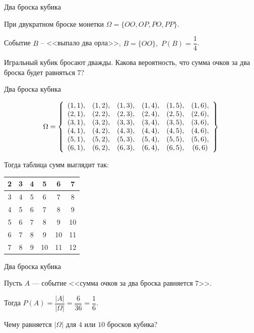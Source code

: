 \begin{frame}{Два броска кубика}

\exmpl При двукратном броске монетки $\Omega=\{OO,OP,PO,PP\}.$ 

Событие $B$ -- <<выпало два орла>>, $B=\{OO\},$ $P(B)=\dfrac{1}{4}$.

\exmpl Игральный кубик бросают дважды. Какова вероятность, что сумма очков за два броска будет равняться $7$?

\end{frame}

\begin{frame}{Два броска кубика}

$$\Omega= \left\lbrace\begin{array}{c c c c c c }
(1,1), & (1,2), & (1,3), & (1,4), & (1,5), & (1,6), \\
(2,1), & (2,2), & (2,3), & (2,4), & (2,5), & (2,6), \\
(3,1), & (3,2), & (3,3), & (3,4), & (3,5), & (3,6), \\
(4,1), & (4,2), & (4,3), & (4,4), & (4,5), & (4,6), \\
(5,1), & (5,2), & (5,3), & (5,4), & (5,5), & (5,6), \\
(6,1), & (6,2), & (6,3), & (6,4), & (6,5), & (6,6) \\
\end{array}\right\rbrace$$

Тогда таблица сумм выглядит так:

\begin{center}
\renewcommand{\arraystretch}{1.1}
\setlength{\tabcolsep}{15pt}
\begin{tabular}{|c|c|c|c|c|c|}
\hline 2 & 3 & 4 & 5 & 6 & 7 \\
\hline 3 & 4 & 5 & 6 & 7 & 8 \\
\hline 4 & 5 & 6 & 7 & 8 & 9 \\
\hline 5 & 6 & 7 & 8 & 9 & 10 \\
\hline 6 & 7 & 8 & 9 & 10 & 11 \\
\hline 7 & 8 & 9 & 10 & 11 & 12 \\
\hline
\end{tabular}
\end{center}

\end{frame}

\begin{frame}{Два броска кубика}

Пусть $A$ ---  событие <<сумма очков за два броска равняется $7$>>. 

Тогда $P(A)=\dfrac{|A|}{|\Omega|}=\dfrac{6}{36}=\boxed{\dfrac 16}.$


\exmpl Чему равняется $|\Omega|$ для $4$ или $10$ бросков кубика?


\end{frame}

